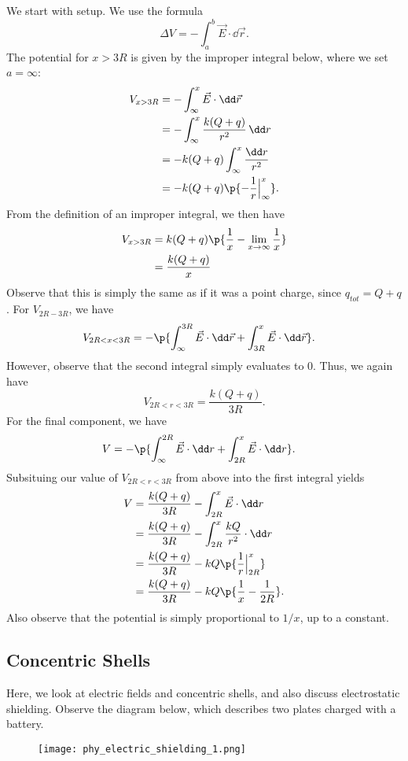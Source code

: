 \documentclass[11pt]{article}
\begin{document}
\begin{solution}
    We start with setup. We use the formula
    \[\Delta V = -\int_a^b\vec{E}\cdot\dd\vec{r}.\]
    The potential for $x > 3R$ is given by the improper integral below, where we set $a = \infty$:
    \begin{align*}
        V_{x > 3R} &= -\int_{\infty}^{x} \vec{E}\cdot\dd \vec{r} \\
        &= -\int_{\infty}^{x}\frac{k(Q+q)}{r^2}\,\dd r\\
        &= -k(Q+q) \int_{\infty}^{x} \frac{\dd r}{r^2} \\
        &= -k(Q+q)\p{-\frac{1}{r}\Big|_{\infty}^x}.
    \end{align*}
    From the definition of an improper integral, we then have
    \begin{align*}
        V_{x>3R} &= k(Q+q)\p{\frac{1}{x}-\lim_{x\to\infty}\frac{1}{x}} \\
        &= \frac{k(Q+q)}{x}  
    \end{align*}
    Observe that this is simply the same as if it was a point charge, since $q_{tot} = Q+q$. For $V_{2R-3R}$, we have
    \begin{align*}
        V_{2R<x<3R} &= -\p{\int_{\infty}^{3R} \vec{E}\cdot\dd\vec{r}+ \int_{3R}^{x} \vec{E}\cdot\dd\vec{r}}.
    \end{align*}
    However, observe that the second integral simply evaluates to 0. Thus, we again have
    \[V_{2R<r<3R} = \frac{k(Q+q)}{3R}.\]
    For the final component, we have
    \begin{align*}
        V &= -\p{\int_{\infty}^{2R}\vec{E}\cdot \dd r + \int_{2R}^x\vec{E}\cdot\dd r}.    
    \end{align*}
    Subsituing our value of $V_{2R<r<3R}$ from above into the first integral yields
    \begin{align*}
        V &= \frac{k(Q+q)}{3R} - \int_{2R}^x \vec{E}\cdot \dd r \\
        &= \frac{k(Q+q)}{3R} - \int_{2R}^x \frac{kQ}{r^2}\cdot \dd r \\
        &= \frac{k(Q+q)}{3R} - kQ\p{\frac{1}{r}\Big|_{2R}^x} \\
        &= \frac{k(Q+q)}{3R} - kQ\p{\frac{1}{x}-\frac{1}{2R}}.
    \end{align*}
    Also observe that the potential is simply proportional to $1/x$, up to a constant.
\end{solution}
\subsection{Concentric Shells}
Here, we look at electric fields and concentric shells, and also discuss electrostatic shielding. Observe the diagram below, which describes two plates charged with a battery.
\begin{figure}[H]
    \centering
    \texttt{[image: phy\_electric\_shielding\_1.png]}
\end{figure}
\end{document}
